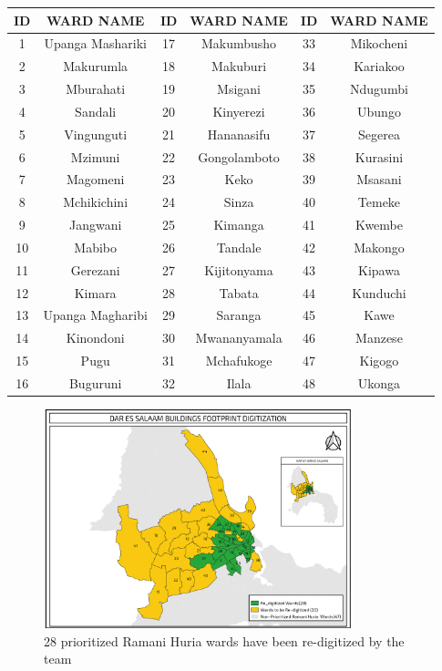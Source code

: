 \documentclass[a4paper,12pt,twoside]{article}
\begin{document}
\begin{center}
\begin{tabular}{|c|c|c|c|c|c|}
\hline
ID & WARD NAME & ID & WARD NAME & ID & WARD NAME\\
\hline
1 & Upanga Mashariki & 17  & Makumbusho & 33  & Mikocheni\\
2 &  Makurumla & 18 &  Makuburi & 34  & Kariakoo\\
3 &  Mburahati & 19  & Msigani & 35  & Ndugumbi\\
4 &  Sandali & 20  & Kinyerezi & 36  & Ubungo\\
5  & Vingunguti & 21  & Hananasifu & 37  & Segerea\\
6 &  Mzimuni & 22  & Gongolamboto & 38  & Kurasini\\
7  & Magomeni & 23  & Keko & 39  & Msasani\\
8  & Mchikichini & 24  & Sinza & 40  & Temeke\\
9  & Jangwani & 25  & Kimanga & 41  & Kwembe\\
10  & Mabibo & 26  & Tandale & 42  & Makongo\\
11  & Gerezani & 27  & Kijitonyama & 43  & Kipawa\\
12  & Kimara & 28  & Tabata & 44  & Kunduchi\\
13 &  Upanga Magharibi & 29  & Saranga & 45  & Kawe\\
14 &  Kinondoni & 30  & Mwananyamala & 46  & Manzese\\
15 &  Pugu & 31  & Mchafukoge & 47  & Kigogo\\
16 &  Buguruni & 32  & Ilala & 48  & Ukonga\\
 \hline
\end{tabular}
\end{center}

\begin{figure}[h]
  \caption{28 prioritized Ramani Huria wards have been re-digitized by the team}
  \centering
 \includegraphics[width=0.8\textwidth]{images/Building_Footprint_Digitization.png}
\end{figure}
\end{document}
